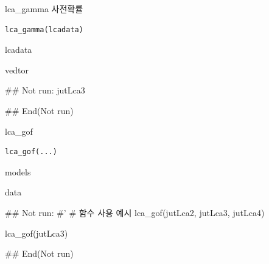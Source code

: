 \documentclass[a4paper]{book}
\begin{document}
%
\begin{Description}
lca\_gamma 사전확률
\end{Description}
%
\begin{Usage}
\begin{verbatim}
lca_gamma(lcadata)
\end{verbatim}
\end{Usage}
%
\begin{Arguments}
\begin{ldescription}
\item[\code{lcadata}] lcadata
\end{ldescription}
\end{Arguments}
%
\begin{Value}
vedtor
\end{Value}
%
\begin{Examples}
\begin{ExampleCode}
\#\# Not run: 
jutLca3%

## End(Not run)
\end{ExampleCode}
\end{Examples}
%
\begin{Description}
lca\_gof
\end{Description}
%
\begin{Usage}
\begin{verbatim}
lca_gof(...)
\end{verbatim}
\end{Usage}
%
\begin{Arguments}
\begin{ldescription}
\item[\code{...}] models
\end{ldescription}
\end{Arguments}
%
\begin{Value}
data
\end{Value}
%
\begin{Examples}
\begin{ExampleCode}

\#\# Not run: 
#'
# 함수 사용 예시
lca_gof(jutLca2, jutLca3, jutLca4)

lca_gof(jutLca3)%

## End(Not run)
\end{ExampleCode}
\end{Examples}
\end{document}
